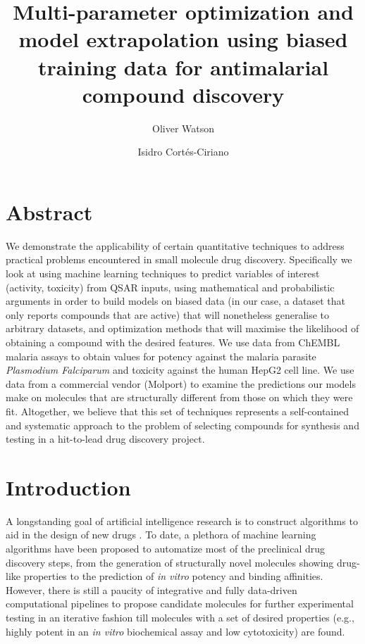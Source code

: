 \documentclass[journal=jacsat,manuscript=article]{achemso}
\author{Oliver Watson}
\affiliation[]{Evariste Technologies Ltd}
\author{Isidro Cortés-Ciriano}
\affiliation[]{Centre for Molecular Informatics, Department of Chemistry, University of Cambridge, Lensfield Road, Cambridge, CB2 1EW, United Kingdom.}
\title{Multi-parameter optimization and model extrapolation using biased training data for antimalarial compound discovery}
\begin{document}

\maketitle

\section*{Abstract}

We demonstrate the applicability of certain quantitative techniques to address practical problems encountered in small molecule drug discovery.  Specifically we look at using machine learning techniques to predict variables of interest (activity, toxicity) from QSAR inputs, using mathematical and probabilistic arguments in order to build models on biased data (in our case, a dataset that only reports compounds that are active) that will nonetheless generalise to arbitrary datasets, and optimization methods that will maximise the likelihood of obtaining a compound with the desired features.  We use data from ChEMBL malaria assays to obtain values for potency against the malaria parasite \textit{Plasmodium Falciparum} and toxicity against the human HepG2 cell line.  We use data from a commercial vendor (Molport) to examine the predictions our models make on 
molecules that are structurally  different from those on which they were fit. Altogether, we believe that this set of techniques represents a self-contained and systematic approach to the problem of selecting compounds for synthesis and testing in a hit-to-lead drug discovery project.
\newpage


\section*{Introduction}
A longstanding goal of artificial intelligence research is to construct algorithms 
to aid in the design of new drugs \cite{Gawehn2016,Chen2018}. 
To date, a plethora of machine learning algorithms have been proposed to automatize most of the preclinical drug discovery steps, from the generation of structurally novel molecules showing drug-like properties\cite{Kang2018} to the prediction of {\it in vitro} potency and binding affinities\cite{Ozturk2018}. However, there is still a paucity of integrative and fully data-driven computational pipelines to propose candidate molecules for further experimental testing in an iterative fashion till molecules with a set of desired properties (e.g., highly potent in an {\it in vitro} biochemical assay and low cytotoxicity) are found. 
\end{document}
